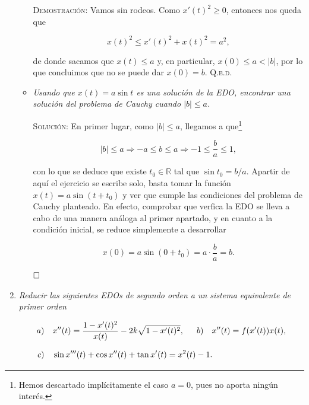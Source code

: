 \documentclass{article}
\begin{document}
\begin{enumerate}
\begin{itemize}
        \vspace{7px}

        \textsc{Demostración:} Vamos sin rodeos. Como $x'(t)^2 \geq 0$, entonces nos queda que 

        \[x(t)^2 \leq x'(t)^2 + x(t)^2 = a^2,\]

        de donde sacamos que $x(t) \leq a$ y, en particular, $x(0) \leq a < |b|$, por lo que concluimos que no se puede dar $x(0) = b$. \hfill{\textsc{Q.e.d.}}

        \vspace{7px}

        \newpage

        \item \textit{Usando que $x(t) = a\sin t$ es una solución de la EDO, encontrar una solución del problema de Cauchy cuando $|b| \leq a$.}

        \vspace{7px}

        \textsc{Solución:} En primer lugar, como $|b| \leq a$, llegamos a que\footnote{Hemos descartado implícitamente el caso $a = 0$, pues no aporta ningún interés.}

        \[|b| \leq a \Longrightarrow -a \leq b \leq a \Longrightarrow -1 \leq \frac{b}{a} \leq 1,\]

        con lo que se deduce que existe $t_0 \in \mathbb{R}$ tal que $\sin t_0 = b/a$. Apartir de aquí el ejercicio se escribe solo,
        basta tomar la función $x(t) = a\sin(t + t_0)$ y ver que cumple las condiciones del problema de Cauchy planteado. En efecto,
        comprobar que verfica la EDO se lleva a cabo de una manera análoga al primer apartado, y en cuanto a la condición inicial, se reduce 
        simplemente a desarrollar

        \[x(0) = a\sin(0 + t_0) = a \cdot \frac{b}{a} = b.\]

        $\hfill\square$
    \end{itemize}

    \item \textit{Reducir las siguientes EDOs de segundo orden a un sistema equivalente de primer orden}
        
    \[a) \hspace{10px} x''(t) = \frac{1 - x'(t)^2}{x(t)} - 2k\sqrt{1 - x'(t)^2}, \hspace{15px} b) \hspace{10px} x''(t) = f(x'(t))x(t),\]

    \[c) \hspace{10px} \sin x'''(t) + \cos x''(t) + \tan x'(t) = x^2(t) - 1. \hspace{88px}\]


\end{enumerate}
\end{document}
